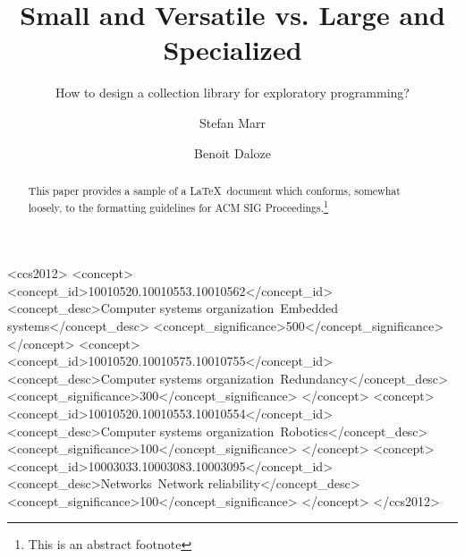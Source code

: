 \documentclass[sigconf, 10pt, review]{acmart}
\def\Title{Small and Versatile vs. Large and Specialized}
\def\SubTitle{How to design a collection library for exploratory programming?}
\begin{document}
\title{\Title}
\subtitle{\SubTitle}

\author{Stefan Marr}

\author{Benoit Daloze}




\begin{abstract}
This paper provides a sample of a \LaTeX\ document which conforms,
somewhat loosely, to the formatting guidelines for
ACM SIG Proceedings.\footnote{This is an abstract footnote}
\end{abstract}

%
%
\begin{CCSXML}
<ccs2012>
 <concept>
  <concept_id>10010520.10010553.10010562</concept_id>
  <concept_desc>Computer systems organization~Embedded systems</concept_desc>
  <concept_significance>500</concept_significance>
 </concept>
 <concept>
  <concept_id>10010520.10010575.10010755</concept_id>
  <concept_desc>Computer systems organization~Redundancy</concept_desc>
  <concept_significance>300</concept_significance>
 </concept>
 <concept>
  <concept_id>10010520.10010553.10010554</concept_id>
  <concept_desc>Computer systems organization~Robotics</concept_desc>
  <concept_significance>100</concept_significance>
 </concept>
 <concept>
  <concept_id>10003033.10003083.10003095</concept_id>
  <concept_desc>Networks~Network reliability</concept_desc>
  <concept_significance>100</concept_significance>
 </concept>
</ccs2012>
\end{CCSXML}

\end{document}
